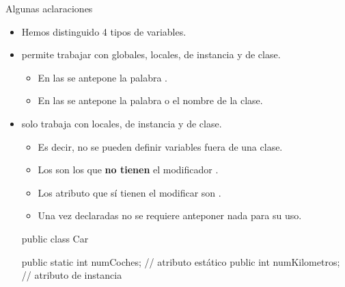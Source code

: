 \documentclass[10pt,envcountsect,spanish]{beamer}
\begin{document}
\begin{frame}[fragile]{Algunas aclaraciones}

\begin{itemize}
\item Hemos distinguido 4 tipos de variables.
\item {} permite trabajar con globales, locales, de instancia y de clase.
\begin{itemize}
\item En las  se antepone la palabra .
\item En las  se antepone la palabra  o el nombre de la clase.
\end{itemize}

\item {} solo trabaja con locales, de instancia y de clase.
\begin{itemize}
\item Es decir, no se pueden definir variables fuera de una clase.
\item Los  son los que \textbf{no tienen} el modificador .
\item Los atributo que sí tienen el modificar  son . 
\item Una vez declaradas no se requiere anteponer nada para su uso.
\end{itemize}

\begin{code}
public class Car { 
    public static int numCoches; // atributo estático
    public int numKilometros;     // atributo de instancia

}
\end{code}

\end{itemize}
\end{frame}
\end{document}
